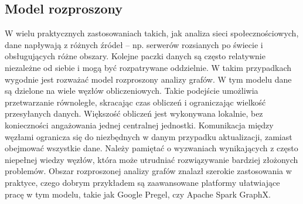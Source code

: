     \subsection{Model rozproszony}
        W wielu praktycznych zastosowaniach takich, jak analiza sieci społecznościowych, dane napływają z różnych źródeł -- np. serwerów rozsianych po świecie i obsługujących różne obszary. Kolejne paczki danych są często relatywnie niezależne od siebie i mogą być rozpatrywane oddzielnie. W takim przypadkach wygodnie jest rozważać model rozproszony analizy grafów. W tym modelu dane są dzielone na wiele węzłów obliczeniowych. Takie podejście umożliwia przetwarzanie równoległe, skracając czas obliczeń i ograniczając wielkość przesyłanych danych. Większość obliczeń jest wykonywana lokalnie, bez konieczności angażowania jednej centralnej jednostki. Komunikacja między węzłami ogranicza się do niezbędnych w danym przypadku aktualizacji, zamiast obejmować wszystkie dane. Należy pamiętać o wyzwaniach wynikających z często niepełnej wiedzy węzłów, która może utrudniać rozwiązywanie bardziej złożonych problemów. Obszar rozproszonej analizy grafów znalazł szerokie zastosowania w praktyce, czego dobrym przykładem są zaawansowane platformy ułatwiające pracę w tym modelu, takie jak Google Pregel\cite{Malewicz_Austern_Bik_Dehnert_Horn_Leiser_Czajkowski_2010}, czy Apache Spark GraphX\cite{Xin_Gonzalez_Franklin_Stoica_2013}. 